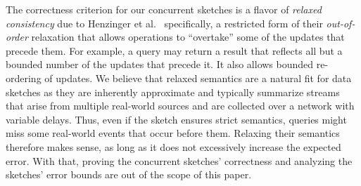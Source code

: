  The correctness criterion for our concurrent sketches is a flavor of 
 \emph{relaxed consistency} due to Henzinger et al.~\cite{Henzinger2013}    
 specifically, a restricted form of their   \emph{out-of-order} relaxation 
 that allows operations to ``overtake'' some of the updates that precede them.  
 For example, a query may return a result that reflects all but a bounded number of the updates
 that precede it. It also allows bounded re-ordering of updates.
We believe that relaxed semantics are a natural fit for data sketches
as they are inherently approximate and typically summarize streams that  arise from multiple real-world sources  
and are collected over a network with variable delays. Thus, even if the sketch ensures strict semantics, 
queries might miss some real-world events that occur before them.
Relaxing their semantics therefore makes sense, as long as it does not excessively increase the expected error. 
With that, proving the concurrent sketches' correctness and analyzing the sketches' error bounds
are out of the scope of this paper.

